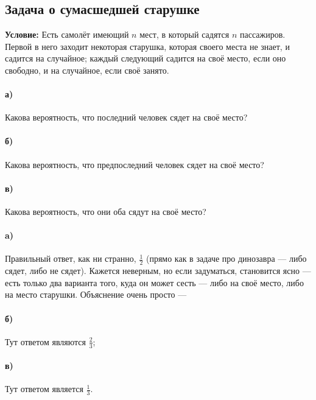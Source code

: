 
\newcommand\independent{\protect\mathpalette{\protect\independenT}{\perp}}
\def\independenT#1#2{\mathrel{\rlap{$#1#2$}\mkern2mu{#1#2}}}



\section*{}

\subsection{Задача о сумасшедшей старушке}

\textbf{Условие:} Есть самолёт имеющий $n$ мест, в который садятся $n$ пассажиров. Первой в него заходит некоторая старушка, которая своего места не знает, и садится на случайное; каждый следующий садится на своё место, если оно свободно, и на случайное, если своё занято. 
\paragraph{а)} Какова вероятность, что последний человек сядет на своё место?
\paragraph{б)} Какова вероятность, что предпоследний человек сядет на своё место?
\paragraph{в)} Какова вероятность, что они оба сядут на своё место?

\paragraph{a)} Правильный ответ, как ни странно, $\frac{1}{2}$ (прямо как в задаче про динозавра --- либо сядет, либо не сядет). Кажется неверным, но если задуматься, становится ясно --- есть только два варианта того, куда он может сесть --- либо на своё место, либо на место старушки. Объяснение очень просто --- 

\paragraph{б)} Тут ответом являются $\frac{2}{3}$;

\paragraph{в)} Тут ответом является $\frac{1}{3}$.


